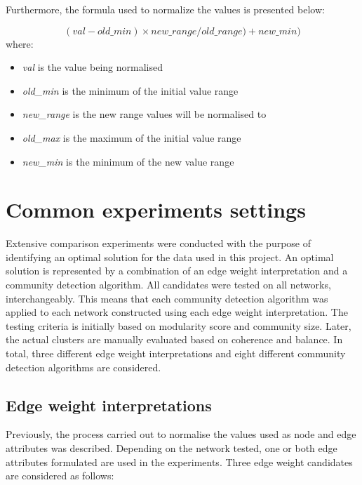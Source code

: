 \clearpage

\noindent Furthermore, the formula used to normalize the values is presented below:

\begin{equation}
    (val - old\_min) \times new\_range / old\_range) + new\_min)
\end{equation}
where:
\begin{itemize}[noitemsep]
    \item \textit{val} is the value being normalised
    \item \textit{old\_min} is the minimum of the initial value range
    \item \textit{new\_range} is the new range values will be normalised to
    \item \textit{old\_max} is the maximum of the initial value range
    \item \textit{new\_min} is the minimum of the new value range
\end{itemize}

\section{Common experiments settings}

Extensive comparison experiments were conducted with the purpose of identifying an optimal solution for the data used in this project. An optimal solution is represented by a combination of an edge weight interpretation and a community detection algorithm. All candidates were tested on all networks, interchangeably. This means that each community detection algorithm was applied to each network constructed using each edge weight interpretation. The testing criteria is initially based on modularity score and community size. Later, the actual clusters are manually evaluated based on coherence and balance. In total, three different edge weight interpretations and eight different community detection algorithms are considered.

\subsection{Edge weight interpretations}

Previously, the process carried out to normalise the values used as node and edge attributes was described. Depending on the network tested, one or both edge attributes formulated are used in the experiments. Three edge weight candidates are considered as follows:

